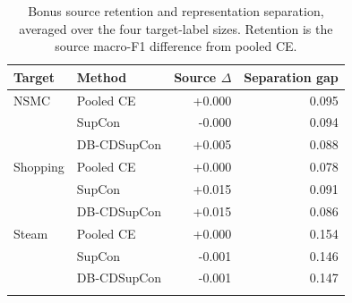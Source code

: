 \begin{table}[t]
\centering
\caption{Bonus source retention and representation separation, averaged over the four target-label sizes. Retention is the source macro-F1 difference from pooled CE.}
\label{tab:bonus-diagnostics}
\scriptsize
\begin{tabular}{llrr}
\toprule
Target & Method & Source $\Delta$ & Separation gap \\
\midrule
NSMC & Pooled CE & +0.000 & 0.095 \\
 & SupCon & -0.000 & 0.094 \\
 & DB-CDSupCon & +0.005 & 0.088 \\
\addlinespace
Shopping & Pooled CE & +0.000 & 0.078 \\
 & SupCon & +0.015 & 0.091 \\
 & DB-CDSupCon & +0.015 & 0.086 \\
\addlinespace
Steam & Pooled CE & +0.000 & 0.154 \\
 & SupCon & -0.001 & 0.146 \\
 & DB-CDSupCon & -0.001 & 0.147 \\
\addlinespace
\bottomrule
\end{tabular}
\end{table}
